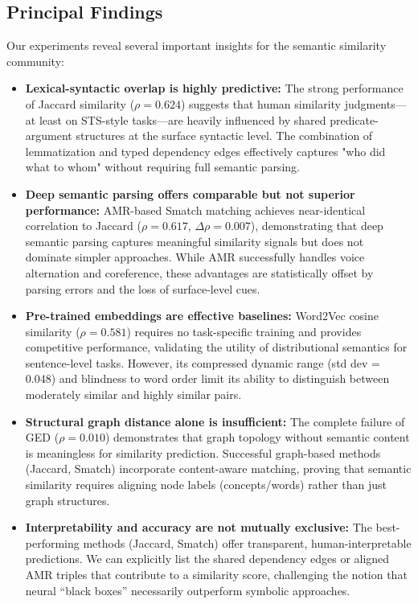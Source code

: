\documentclass[11pt,a4paper]{article}
\begin{document}
\subsection{Principal Findings}

Our experiments reveal several important insights for the semantic similarity community:

\begin{itemize}
    \item \textbf{Lexical-syntactic overlap is highly predictive:} The strong performance of Jaccard similarity ($\rho = 0.624$) suggests that human similarity judgments---at least on STS-style tasks---are heavily influenced by shared predicate-argument structures at the surface syntactic level. The combination of lemmatization and typed dependency edges effectively captures "who did what to whom" without requiring full semantic parsing.
    
    \item \textbf{Deep semantic parsing offers comparable but not superior performance:} AMR-based Smatch matching achieves near-identical correlation to Jaccard ($\rho = 0.617$, $\Delta\rho = 0.007$), demonstrating that deep semantic parsing captures meaningful similarity signals but does not dominate simpler approaches. While AMR successfully handles voice alternation and coreference, these advantages are statistically offset by parsing errors and the loss of surface-level cues.
    
    \item \textbf{Pre-trained embeddings are effective baselines:} Word2Vec cosine similarity ($\rho = 0.581$) requires no task-specific training and provides competitive performance, validating the utility of distributional semantics for sentence-level tasks. However, its compressed dynamic range (std dev = 0.048) and blindness to word order limit its ability to distinguish between moderately similar and highly similar pairs.
    
    \item \textbf{Structural graph distance alone is insufficient:} The complete failure of GED ($\rho = 0.010$) demonstrates that graph topology without semantic content is meaningless for similarity prediction. Successful graph-based methods (Jaccard, Smatch) incorporate content-aware matching, proving that semantic similarity requires aligning node labels (concepts/words) rather than just graph structures.
    
    \item \textbf{Interpretability and accuracy are not mutually exclusive:} The best-performing methods (Jaccard, Smatch) offer transparent, human-interpretable predictions. We can explicitly list the shared dependency edges or aligned AMR triples that contribute to a similarity score, challenging the notion that neural ``black boxes'' necessarily outperform symbolic approaches.
\end{itemize}
\end{document}
